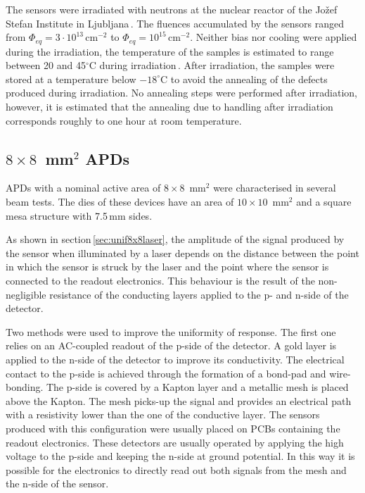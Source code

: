 \documentclass[3p,preprint,twocolumn]{elsarticle}
\begin{document}
The sensors were irradiated with neutrons at the nuclear reactor of the Jo\v{z}ef Stefan Institute in Ljubljana\,\cite{jsiIrrad}.
The fluences accumulated by the sensors ranged from $\Phi_{eq} = 3 \cdot 10^{13}$\,cm$^{-2}$ to $\Phi_{eq} = 10^{15}$\,cm$^{-2}$.
Neither bias nor cooling were applied during the irradiation, the temperature of the samples is estimated to range between 20 and 45$^\circ$C during irradiation\,\cite{vlado}.
After irradiation, the samples were stored at a temperature below $-18^\circ$C to avoid the annealing of the defects produced during irradiation.
No annealing steps were performed after irradiation, however, it is estimated that the annealing due to handling after irradiation corresponds roughly to one hour at room temperature.

\subsection{$8 \times 8$~mm$^2$ APDs}

APDs with a nominal active area of $8 \times 8$~mm$^2$ were characterised in several beam tests.
The dies of these devices have an area of $10 \times 10$~mm$^2$ and a square mesa structure with 7.5\,mm sides.

As shown in section\,\ref{sec:unif8x8laser}, the amplitude of the signal produced by the sensor when illuminated by a laser depends on the distance between the point in which the sensor is struck by the laser and the point where the sensor is connected to the readout electronics.
This behaviour is the result of the non-negligible resistance of the conducting layers applied to the p- and n-side of the detector.

Two methods were used to improve the uniformity of response.
The first one relies on an AC-coupled readout of the p-side of the detector.
A gold layer is applied to the n-side of the detector to improve its conductivity.
The electrical contact to the p-side is achieved through the formation of a bond-pad and wire-bonding.
The p-side is covered by a Kapton layer and a metallic mesh is placed above the Kapton.
The mesh picks-up the signal and provides an electrical path with a resistivity lower than the one of the conductive layer.
The sensors produced with this configuration were usually placed on PCBs containing the readout electronics.
These detectors are usually operated by applying the high voltage to the p-side and keeping the n-side at ground potential.
In this way it is possible for the electronics to directly read out both signals from the mesh and the n-side of the sensor.
\end{document}
